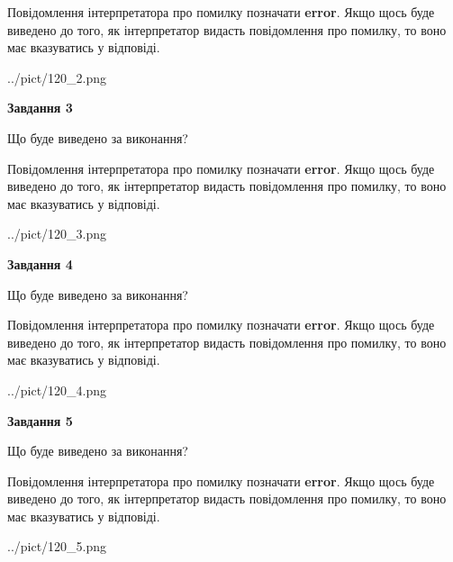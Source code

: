 \documentclass[12pt, ukrainian]{article}
\begin{document}
{\begin {large}
Повідомлення інтерпретатора про помилку позначати \textbf{error}.
Якщо щось буде виведено до того, як інтерпретатор видасть повідомлення про помилку, 
то воно має вказуватись у відповіді. \par


\begin{center}
	{../pict/120_2.png}
\end{center}
\newpage

{\begin {center}\textbf{Завдання 3}\end {center}}\par
Що буде виведено за виконання?

Повідомлення інтерпретатора про помилку позначати \textbf{error}.
Якщо щось буде виведено до того, як інтерпретатор видасть повідомлення про помилку, 
то воно має вказуватись у відповіді. \par


\begin{center}
	{../pict/120_3.png}
\end{center}
\newpage

{\begin {center}\textbf{Завдання 4}\end {center}}\par
Що буде виведено за виконання?

Повідомлення інтерпретатора про помилку позначати \textbf{error}.
Якщо щось буде виведено до того, як інтерпретатор видасть повідомлення про помилку, 
то воно має вказуватись у відповіді. \par


\begin{center}
	{../pict/120_4.png}
\end{center}
\newpage

{\begin {center}\textbf{Завдання 5}\end {center}}\par
Що буде виведено за виконання?

Повідомлення інтерпретатора про помилку позначати \textbf{error}.
Якщо щось буде виведено до того, як інтерпретатор видасть повідомлення про помилку, 
то воно має вказуватись у відповіді. \par


\begin{center}
	{../pict/120_5.png}
\end{center}
\newpage


\end{large}}
\end{document}
